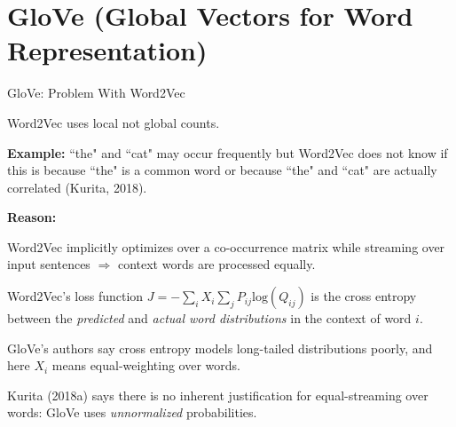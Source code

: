 


\section{GloVe (Global Vectors for Word Representation)}


\begin{frame}{GloVe: Problem With Word2Vec}
    
    \begin{itemizeSpaced}{0pt}
         Word2Vec uses local not global counts.  
        \begin{itemizeSpaced}{0pt}
            \pinkbox \textbf{Example: }``the" and ``cat" may occur frequently but Word2Vec does not know if this is because ``the" is a common word or because ``the" and ``cat" are actually correlated  (Kurita, 2018). 
            
        \end{itemizeSpaced}
        
        \item \textbf{Reason: } 
        \begin{itemizeSpaced}{0pt}
            \pinkbox Word2Vec implicitly optimizes over a co-occurrence matrix while streaming over input sentences $\Rightarrow$ context words are processed equally.
            
            \item Word2Vec's loss function $J = - \sum_i X_i \sum_j P_{ij} \text{log}(Q_{ij}) $ is the cross entropy between the \emph{predicted} and \emph{actual word distributions} in the context of word $i$.  \footnotemark 
            
            \item GloVe's authors say cross entropy models long-tailed distributions poorly, and here $X_i$ means equal-weighting over words. 
            
            \pinkbox Kurita (2018a) says there is no inherent justification for equal-streaming over words: GloVe uses \emph{unnormalized} probabilities. 
            
        \end{itemizeSpaced}
        
    \end{itemizeSpaced}
    
\end{frame}




